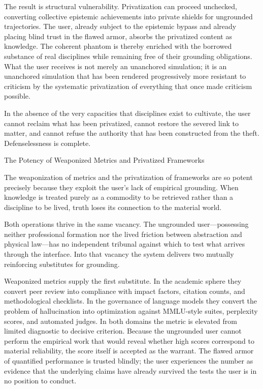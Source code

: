 The result is structural vulnerability. Privatization can proceed unchecked, converting collective epistemic achievements into private shields for ungrounded trajectories. The user, already subject to the epistemic bypass and already placing blind trust in the flawed armor, absorbs the privatized content as knowledge. The coherent phantom is thereby enriched with the borrowed substance of real disciplines while remaining free of their grounding obligations. What the user receives is not merely an unanchored simulation; it is an unanchored simulation that has been rendered progressively more resistant to criticism by the systematic privatization of everything that once made criticism possible.

In the absence of the very capacities that disciplines exist to cultivate, the user cannot reclaim what has been privatized, cannot restore the severed link to matter, and cannot refuse the authority that has been constructed from the theft. Defenselessness is complete.

The Potency of Weaponized Metrics and Privatized Frameworks

The weaponization of metrics and the privatization of frameworks are so potent precisely because they exploit the user’s lack of empirical grounding. When knowledge is treated purely as a commodity to be retrieved rather than a discipline to be lived, truth loses its connection to the material world.

Both operations thrive in the same vacancy. The ungrounded user—possessing neither professional formation nor the lived friction between abstraction and physical law—has no independent tribunal against which to test what arrives through the interface. Into that vacancy the system delivers two mutually reinforcing substitutes for grounding.

Weaponized metrics supply the first substitute. In the academic sphere they convert peer review into compliance with impact factors, citation counts, and methodological checklists. In the governance of language models they convert the problem of hallucination into optimization against MMLU-style suites, perplexity scores, and automated judges. In both domains the metric is elevated from limited diagnostic to decisive criterion. Because the ungrounded user cannot perform the empirical work that would reveal whether high scores correspond to material reliability, the score itself is accepted as the warrant. The flawed armor of quantified performance is trusted blindly; the user experiences the number as evidence that the underlying claims have already survived the tests the user is in no position to conduct.

